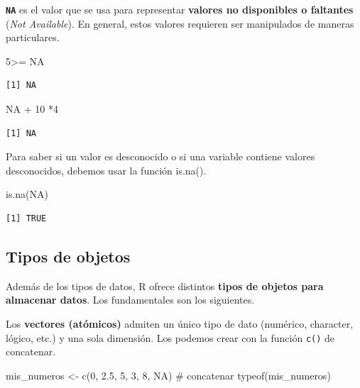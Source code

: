 \documentclass[
  letterpaper,
  DIV=11,
  numbers=noendperiod]{scrartcl}
\newenvironment{Shaded}{\begin{snugshade}}{\end{snugshade}}
\newcommand{\CommentTok}[1]{\textcolor[rgb]{0.37,0.37,0.37}{#1}}
\newcommand{\ConstantTok}[1]{\textcolor[rgb]{0.56,0.35,0.01}{#1}}
\newcommand{\DecValTok}[1]{\textcolor[rgb]{0.68,0.00,0.00}{#1}}
\newcommand{\FloatTok}[1]{\textcolor[rgb]{0.68,0.00,0.00}{#1}}
\newcommand{\FunctionTok}[1]{\textcolor[rgb]{0.28,0.35,0.67}{#1}}
\newcommand{\NormalTok}[1]{\textcolor[rgb]{0.00,0.23,0.31}{#1}}
\newcommand{\OtherTok}[1]{\textcolor[rgb]{0.00,0.23,0.31}{#1}}
\newcommand{\SpecialCharTok}[1]{\textcolor[rgb]{0.37,0.37,0.37}{#1}}
\begin{document}
\textbf{\texttt{NA}} es el valor que se usa para representar
\textbf{valores no disponibles o faltantes} (\emph{Not Available}). En
general, estos valores requieren ser manipulados de maneras
particulares.

\begin{Shaded}
\begin{Highlighting}[]
\DecValTok{5}\SpecialCharTok{\textgreater{}=} \ConstantTok{NA}
\end{Highlighting}
\end{Shaded}

\begin{verbatim}
[1] NA
\end{verbatim}

\begin{Shaded}
\begin{Highlighting}[]
\ConstantTok{NA} \SpecialCharTok{+} \DecValTok{10} \SpecialCharTok{*}\DecValTok{4}
\end{Highlighting}
\end{Shaded}

\begin{verbatim}
[1] NA
\end{verbatim}

Para saber si un valor es desconocido o si una variable contiene valores
desconocidos, debemos usar la función is.na().

\begin{Shaded}
\begin{Highlighting}[]
\FunctionTok{is.na}\NormalTok{(}\ConstantTok{NA}\NormalTok{)}
\end{Highlighting}
\end{Shaded}

\begin{verbatim}
[1] TRUE
\end{verbatim}

\subsection{Tipos de objetos}\label{tipos-de-objetos}

Además de los tipos de datos, R ofrece distintos \textbf{tipos de
objetos para almacenar datos}. Los fundamentales son los siguientes.

Los \textbf{vectores (atómicos)} admiten un único tipo de dato
(numérico, character, lógico, etc.) y una sola dimensión. Los podemos
crear con la función \texttt{c()} de concatenar.

\begin{Shaded}
\begin{Highlighting}[]
\NormalTok{mis\_numeros }\OtherTok{\textless{}{-}} \FunctionTok{c}\NormalTok{(}\DecValTok{0}\NormalTok{, }\FloatTok{2.5}\NormalTok{, }\DecValTok{5}\NormalTok{, }\DecValTok{3}\NormalTok{, }\DecValTok{8}\NormalTok{, }\ConstantTok{NA}\NormalTok{) }\CommentTok{\# concatenar }
\FunctionTok{typeof}\NormalTok{(mis\_numeros)  }
\end{Highlighting}
\end{Shaded}
\end{document}
